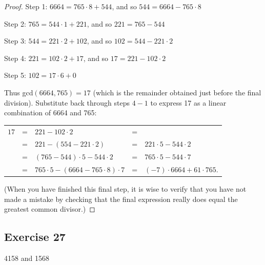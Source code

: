 \documentclass[14pt]{extarticle}
\newcommand{\cy}{\color{cyan}}
\begin{document}
\begin{proof}
        {\cy Step 1:} \(6664 = 765 \cdot 8 + 544\), and so \(544 = 6664 - 765 \cdot 8\)

        {\cy Step 2:} \(765 = 544 \cdot 1 + 221\), and so \(221 = 765 - 544\)

        {\cy Step 3:} \(544 = 221 \cdot 2 + 102\), and so \(102 = 544 - 221 \cdot 2\)

        {\cy Step 4:} \(221 = 102 \cdot 2 + 17\), and so \(17 = 221 - 102 \cdot 2\)

        {\cy Step 5:} \(102 = 17 \cdot 6 + 0\)

        Thus gcd\((6664, 765) = 17\) (which is the remainder obtained just before the final division). Substitute back
        through steps $4-1$ to express 17 as a linear combination of 6664 and 765:

        \begin{tabular}{rclcl}
                \(17\) & = & \(221 - 102 \cdot 2\)                           & = & \(\)                                \\
                \(\)   & = & \(221 - (554 - 221 \cdot 2)\)                   & = & \(221 \cdot 5 - 544 \cdot 2\)       \\
                \(\)   & = & \((765 - 544) \cdot 5 - 544 \cdot 2\)           & = & \(765 \cdot 5 - 544 \cdot 7\)       \\
                \(\)   & = & \(765 \cdot 5 - (6664 - 765 \cdot 8) \cdot 7 \) & = & \((-7) \cdot 6664 + 61 \cdot 765\).
        \end{tabular}

        (When you have finished this final step, it is wise to verify that you have not made a mistake by checking that
        the final expression really does equal the greatest common divisor.)
\end{proof}

\subsection{Exercise 27}
4158 and 1568
\end{document}
